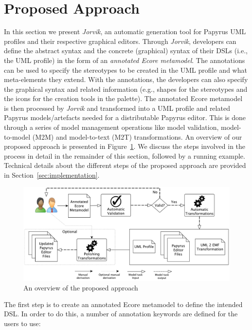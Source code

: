 \section{Proposed Approach}
\label{sec:approach}
In this section we present \textit{Jorvik}, an automatic generation tool for Papyrus UML profiles and their respective graphical editors.
Through \textit{Jorvik}, developers can define the abstract syntax and the concrete (graphical) syntax of their DSLs (i.e., the UML profile) in the form of an \textit{annotated Ecore metamodel}.
The annotations can be used to specify the stereotypes to be created in the UML profile and what meta-elements they extend. 
With the annotations, the developers can also specify the graphical syntax and related information (e.g., shapes for the stereotypes and the icons for the creation tools in the palette). 
The annotated Ecore metamodel is then processed by \textit{Jorvik} and transformed into a UML profile and related Papyrus models/artefacts needed for a distributable Papyrus editor. This is done through a series of model management operations like model validation, model-to-model (M2M) and model-to-text (M2T) transformations. An overview of our proposed approach is presented in Figure~\ref{fig:approachOverview}. 
We discuss the steps involved in the process in detail in the remainder of this section, followed by a running example. 
Technical details about the different steps of the proposed approach are provided in Section~\ref{sec:implementation}.

\begin{figure}
	\centering
	\includegraphics[width=1\textwidth]{diagrams/approachOverview.pdf}
	\caption{An overview of the proposed approach}
	\label{fig:approachOverview}
\end{figure}

The first step is to create an annotated Ecore metamodel to define the intended DSL.
In order to do this, a number of annotation keywords are defined for the users to use:

